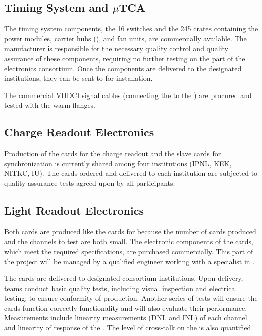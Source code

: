 \subsection{Timing System and $\mu$TCA}
\label{ssec:dp-tpcelec-prod-utca}

The timing system components, the  \num{16}  switches and the \num{245}  crates containing the power modules, carrier hubs (), and fan units, are commercially available. The manufacturer is responsible for the necessary quality control and quality assurance of these components, requiring no further testing on the part of the \dual electronics consortium. Once the components are delivered to the designated institutions, they can be sent to  for installation. 

The commercial VHDCI signal cables (connecting the  to the ) are procured and tested with the  warm flanges.

\subsection{Charge Readout Electronics}
\label{ssec:dp-tpcelec-prod-cro}

Production of the  cards for the charge readout and the  slave cards for synchronization is currently shared among four institutions (IPNL, KEK, NITKC, IU). The cards ordered and delivered to each institution are subjected to quality assurance tests agreed upon by all participants. 

\subsection{Light Readout Electronics}
\label{ssec:dp-tpcelec-prod-lro}

Both   cards are produced like the cards for  because the number of cards produced and the channels to test are both small. The electronic components of the cards, which meet the required specifications, are purchased commercially. This part of the project will be managed by a qualified engineer working with a specialist in .

The cards are delivered to designated consortium institutions. Upon delivery, teams conduct basic quality tests, including visual inspection and electrical testing, to ensure conformity of production. Another series of tests will ensure the cards function correctly functionality and will also evaluate their performance. Measurements include linearity measurements (DNL and INL) of each  channel and linearity of response of the . The level of cross-talk on the  is also quantified.

